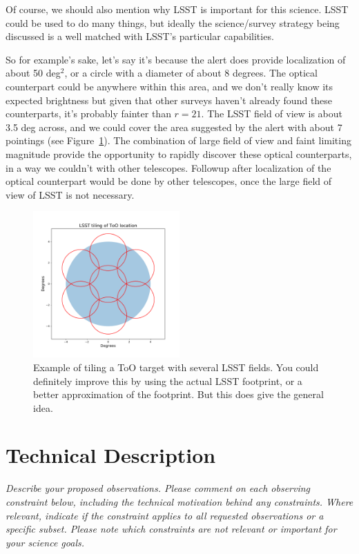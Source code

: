 \documentclass[11pt]{article}
\begin{document}
Of course, we should also mention why LSST is important for this science. LSST could be used 
to do many things, but ideally the science/survey strategy being discussed is a well matched with LSST's particular
capabilities. 

So for example's sake, let's say it's because the alert does provide localization of about 50 deg$^2$, or a circle with 
a diameter of about 8 degrees. The optical counterpart could be anywhere within this area, and we don't really know its
expected brightness but given that other surveys haven't already found these counterparts, it's probably fainter than $r=21$. 
The LSST field of view is about 3.5 deg across, and we could cover the area suggested by the alert with about 7 pointings
(see Figure~\ref{fig:tiling}).  The combination of large field of view and faint limiting magnitude provide the opportunity
to rapidly discover these optical counterparts, in a way we couldn't with other telescopes. 
Followup after localization of the optical counterpart would be done by other telescopes, once the large field of view
of LSST is not necessary.


\begin{figure}
\centering
\includegraphics[width=0.5\textwidth]{ToO_tiling}
\caption{Example of tiling a ToO target with several LSST fields. You could definitely improve this by using the actual LSST footprint,
or a better approximation of the footprint. But this does give the general idea. \label{fig:tiling}}
\end{figure}

\clearpage

\section{Technical Description}
\begin{footnotesize}
{\it Describe your proposed observations. Please comment on each observing constraint
below, including the technical motivation behind any constraints. Where relevant, indicate
if the constraint applies to all requested observations or a specific subset. Please note which 
constraints are not relevant or important for your science goals.}
\end{footnotesize}
\end{document}
